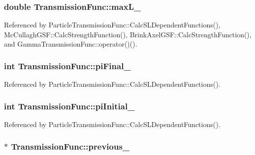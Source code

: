 \hypertarget{classTransmissionFunc_abf332330b8f15b0dd8cdfe7e5596e8dc}{
\subsubsection[{max\-L\-\_\-}]{\setlength{\rightskip}{0pt plus 5cm}double Transmission\-Func\-::max\-L\-\_\-\hspace{0.3cm}{\ttfamily [protected]}}}\label{classTransmissionFunc_abf332330b8f15b0dd8cdfe7e5596e8dc}


Referenced by Particle\-Transmission\-Func\-::\-Calc\-S\-L\-Dependent\-Functions(), Mc\-Cullagh\-G\-S\-F\-::\-Calc\-Strength\-Function(), Brink\-Axel\-G\-S\-F\-::\-Calc\-Strength\-Function(), and Gamma\-Transmission\-Func\-::operator()().

\hypertarget{classTransmissionFunc_a39bd39cf973b2c85b0e54ce9223d15ef}{
\subsubsection[{pi\-Final\-\_\-}]{\setlength{\rightskip}{0pt plus 5cm}int Transmission\-Func\-::pi\-Final\-\_\-\hspace{0.3cm}{\ttfamily [protected]}}}\label{classTransmissionFunc_a39bd39cf973b2c85b0e54ce9223d15ef}


Referenced by Particle\-Transmission\-Func\-::\-Calc\-S\-L\-Dependent\-Functions().

\hypertarget{classTransmissionFunc_aef27640736868be8a9c956f05861c00c}{
\subsubsection[{pi\-Initial\-\_\-}]{\setlength{\rightskip}{0pt plus 5cm}int Transmission\-Func\-::pi\-Initial\-\_\-\hspace{0.3cm}{\ttfamily [protected]}}}\label{classTransmissionFunc_aef27640736868be8a9c956f05861c00c}


Referenced by Particle\-Transmission\-Func\-::\-Calc\-S\-L\-Dependent\-Functions().

\hypertarget{classTransmissionFunc_aa236f5f98e157ac65a372026cc1e903b}{
\subsubsection[{previous\-\_\-}]{$\ast$ Transmission\-Func\-::previous\-\_\-\hspace{0.3cm}{\ttfamily [protected]}}}\label{classTransmissionFunc_aa236f5f98e157ac65a372026cc1e903b}


